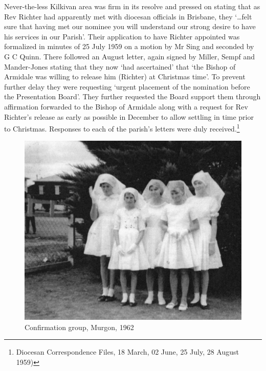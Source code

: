 Never-the-less Kilkivan area was firm in its resolve and pressed on stating that as Rev Richter had apparently met with diocesan officials in Brisbane, they `\ldots felt sure that having met our nominee you will understand our strong desire to have his services in our Parish'. Their application to have Richter appointed was formalized in minutes of 25 July 1959 on a motion by Mr Sing and seconded by G C Quinn. There followed an August letter, again signed by Miller, Sempf and Mander-Jones stating that they now `had ascertained' that `the Bishop of Armidale was willing to release him (Richter) at Christmas time'. To prevent further delay they were requesting `urgent placement of the nomination before the Presentation Board'. They further requested the Board support them through affirmation forwarded to the Bishop of Armidale along with a request for Rev Richter's release as early as possible in December to allow settling in time prior to Christmas. Responses to each of the parish's letters were duly received.\footnote{Diocesan Correspondence Files, 18 March, 02 June, 25 July, 28 August 1959)}








\begin{figure}
\begin{center}
\includegraphics[width=1.\linewidth,center]{../images/confirmation1962.jpg}
\caption{Confirmation group, Murgon, 1962}
\end{center}
\end{figure}




